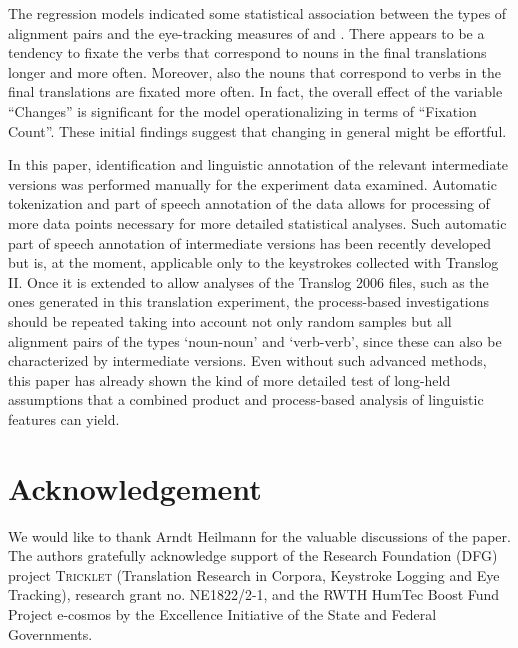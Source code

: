 \documentclass[output=paper]{LSP/langsci}
\begin{document}
The regression models indicated some statistical association between the types of alignment pairs and the eye-tracking measures of  and . There appears to be a tendency to fixate the verbs that correspond to nouns in the final translations longer and more often. Moreover, also the nouns that correspond to verbs in the final translations are fixated more often. In fact, the overall effect of the variable ``Changes'' is significant for the model operationalizing  in terms of ``Fixation Count''. These initial findings suggest that changing  in general might be effortful.

In this paper, identification and linguistic annotation of the relevant intermediate versions was performed manually for the experiment data examined. Automatic tokenization and part of speech annotation of the  data allows for processing of more data points necessary for more detailed statistical analyses. Such automatic part of speech annotation of intermediate versions has been recently developed \citep{Serbina2015Part} but is, at the moment, applicable only to the keystrokes collected with Translog II. Once it is extended to allow analyses of the Translog 2006 files, such as the ones generated in this translation experiment, the process-based investigations should be repeated taking into account not only random samples but all alignment pairs of the types `noun-noun' and `verb-verb', since these can also be characterized by intermediate versions. Even without such advanced methods, this paper has already shown the kind of more detailed test of long-held assumptions that a combined product and process-based analysis of linguistic features can yield. 

\section*{Acknowledgement}
We would like to thank Arndt Heilmann for the valuable discussions of the paper. The authors gratefully acknowledge support of the  Research Foundation (DFG) project \textsc{Tricklet} (Translation Research in Corpora, Keystroke Logging and Eye Tracking), research grant no. NE1822/2-1, and the RWTH HumTec Boost Fund Project e-cosmos by the Excellence Initiative of the  State and Federal Governments.

\newpage 
\sloppy
\printbibliography[heading=subbibliography,notkeyword=this]
\end{document}
